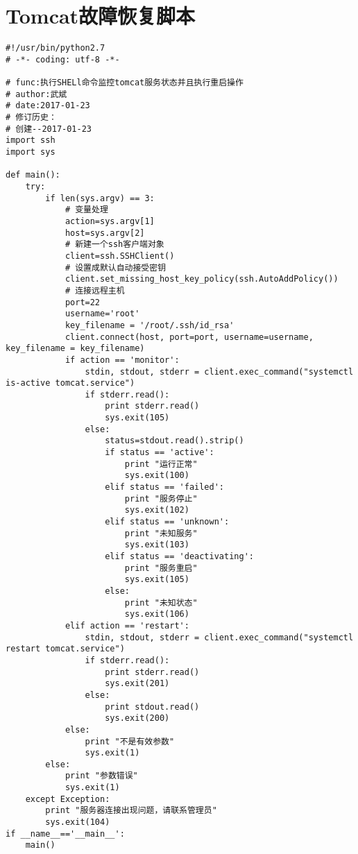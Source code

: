 \chapter{Tomcat故障恢复脚本}
\label{cha:Tomcatfailover}
\begin{lstlisting}[numbers=none]
#!/usr/bin/python2.7
# -*- coding: utf-8 -*-

# func:执行SHELl命令监控tomcat服务状态并且执行重启操作
# author:武斌
# date:2017-01-23
# 修订历史：
# 创建--2017-01-23
import ssh
import sys

def main():
    try:
        if len(sys.argv) == 3:
            # 变量处理
            action=sys.argv[1]
            host=sys.argv[2]
            # 新建一个ssh客户端对象
            client=ssh.SSHClient()
            # 设置成默认自动接受密钥
            client.set_missing_host_key_policy(ssh.AutoAddPolicy())
            # 连接远程主机
            port=22
            username='root'
            key_filename = '/root/.ssh/id_rsa'
            client.connect(host, port=port, username=username, key_filename = key_filename)
            if action == 'monitor':
                stdin, stdout, stderr = client.exec_command("systemctl is-active tomcat.service")
                if stderr.read():
                    print stderr.read()
                    sys.exit(105)
                else:
                    status=stdout.read().strip()
                    if status == 'active':
                        print "运行正常"
                        sys.exit(100)
                    elif status == 'failed':
                        print "服务停止"
                        sys.exit(102)
                    elif status == 'unknown':
                        print "未知服务"
                        sys.exit(103)
                    elif status == 'deactivating':
                        print "服务重启"
                        sys.exit(105)
                    else:
                        print "未知状态"
                        sys.exit(106)
            elif action == 'restart':
                stdin, stdout, stderr = client.exec_command("systemctl restart tomcat.service")
                if stderr.read():
                    print stderr.read()
                    sys.exit(201)
                else:
                    print stdout.read()
                    sys.exit(200)
            else:
                print "不是有效参数"
                sys.exit(1)
        else:
            print "参数错误"
            sys.exit(1)
    except Exception:
        print "服务器连接出现问题，请联系管理员"
        sys.exit(104)
if __name__=='__main__':
    main()
\end{lstlisting}